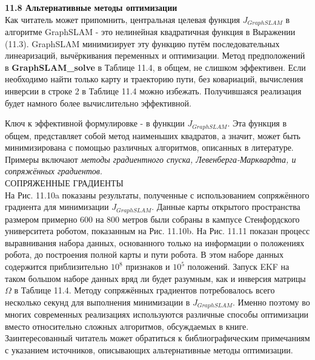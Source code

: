 \documentclass[10pt,a4paper]{article}
\begin{document}
\textbf{11.8	Альтернативные методы оптимизации}\\

Как читатель может припомнить, центральная целевая функция $J_{GraphSLAM}$ в алгоритме GraphSLAM - это нелинейная квадратичная функция в Выражении (11.3). GraphSLAM минимизирует эту функцию путём последовательных линеаризаций, вычёркивания переменных и оптимизации. Метод предположений в \textbf{GraphSLAM\_solve} в Таблице 11.4, в общем, не слишком эффективен. Если необходимо найти только карту и траекторию пути, без ковариаций, вычисления инверсии в строке 2 в Таблице 11.4 можно избежать. Получившаяся реализация будет намного более вычислительно эффективной.

Ключ к эффективной формулировке  - в функции $J_{GraphSLAM}$. Эта функция в общем, представляет собой метод наименьших квадратов, а значит, может быть минимизирована с помощью различных алгоритмов, описанных в литературе. Примеры включают \textit{методы градиентного спуска, Левенберга-Марквардта, и сопряжённых градиентов}.\\

СОПРЯЖЕННЫЕ ГРАДИЕНТЫ\\

На Рис. 11.10a показаны результаты, полученные с использованием сопряжённого градиента для минимизации $J_{GraphSLAM}$. Данные карты открытого пространства размером примерно 600 на 800 метров были собраны в кампусе  Стенфордского университета роботом, показанным на Рис. 11.10b. На Рис. 11.11 показан процесс выравнивания набора данных, основанного только на информации о положениях робота, до построения полной карты и пути робота. В этом наборе данных содержится приблизительно $10^8$ признаков и $10^5$ положений. Запуск EKF на таком большом наборе данных вряд ли будет разумным, как и инверсия матрицы $\varOmega$ в Таблице 11.4. Методу сопряжённых градиентов потребовалось всего несколько секунд для выполнения минимизации в $J_{GraphSLAM}$. Именно поэтому во многих современных реализациях используются различные способы оптимизации вместо относительно сложных алгоритмов, обсуждаемых в книге. Заинтересованный читатель может обратиться к библиографическим примечаниям с указанием источников, описывающих альтернативные методы оптимизации.
\end{document}
